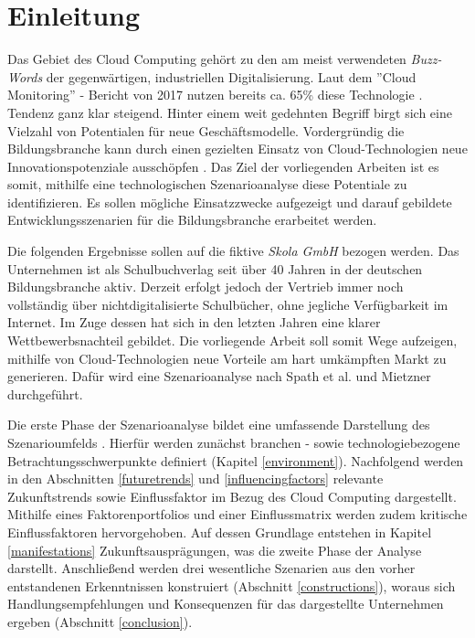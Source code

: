 \section{Einleitung}
\label{introduction}
Das Gebiet des Cloud Computing gehört zu den am meist verwendeten \textit{Buzz-Words} der gegenwärtigen, industriellen Digitalisierung. Laut dem ''Cloud Monitoring'' - Bericht von 2017 nutzen bereits ca. 65\% diese Technologie \cite{bitkom}. Tendenz ganz klar steigend. Hinter einem weit gedehnten Begriff birgt sich eine Vielzahl von Potentialen für neue Geschäftsmodelle. Vordergründig die Bildungsbranche kann durch einen gezielten Einsatz von Cloud-Technologien neue Innovationspotenziale ausschöpfen \cite{meinel2}. Das Ziel der vorliegenden Arbeiten ist es somit, mithilfe eine technologischen Szenarioanalyse diese Potentiale zu identifizieren. Es sollen mögliche Einsatzzwecke aufgezeigt und darauf gebildete Entwicklungsszenarien für die Bildungsbranche erarbeitet werden.

Die folgenden Ergebnisse sollen auf die fiktive \textit{Skola GmbH} bezogen werden. Das Unternehmen ist als Schulbuchverlag seit über 40 Jahren in der deutschen Bildungsbranche aktiv. Derzeit erfolgt jedoch der Vertrieb immer noch vollständig über nichtdigitalisierte Schulbücher, ohne jegliche Verfügbarkeit im Internet. Im Zuge dessen hat sich in den letzten Jahren eine klarer Wettbewerbsnachteil gebildet. Die vorliegende Arbeit soll somit Wege aufzeigen, mithilfe von Cloud-Technologien neue Vorteile am hart umkämpften Markt zu generieren. Dafür wird eine Szenarioanalyse nach Spath et al. \cite{spath} und Mietzner \cite{mietzner} durchgeführt.

Die erste Phase der Szenarioanalyse bildet eine umfassende Darstellung des Szenarioumfelds  \cite{spath}. Hierfür werden zunächst branchen - sowie technologiebezogene Betrachtungsschwerpunkte definiert (Kapitel \ref{environment}). Nachfolgend werden in den Abschnitten \ref{futuretrends} und \ref{influencingfactors} relevante Zukunftstrends sowie Einflussfaktor im Bezug des Cloud Computing dargestellt. Mithilfe eines Faktorenportfolios und einer Einflussmatrix werden zudem kritische Einflussfaktoren hervorgehoben. Auf dessen Grundlage entstehen in Kapitel \ref{manifestations} Zukunftsausprägungen, was die zweite Phase der Analyse darstellt. Anschließend werden drei wesentliche Szenarien aus den vorher entstandenen Erkenntnissen konstruiert (Abschnitt \ref{constructions}), woraus sich Handlungsempfehlungen und Konsequenzen für das dargestellte Unternehmen ergeben (Abschnitt \ref{conclusion}).